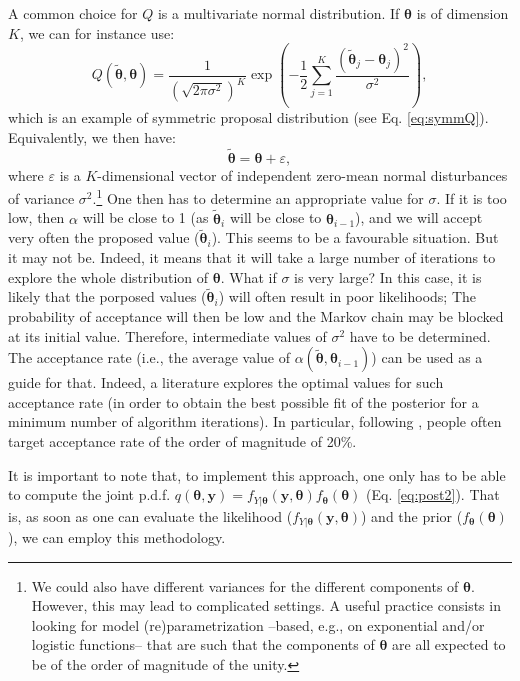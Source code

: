 \documentclass[
  12pt,
]{book}
\theoremstyle{definition}
\theoremstyle{definition}
\theoremstyle{definition}
\theoremstyle{definition}
\theoremstyle{remark}
\begin{document}
A common choice for \(Q\) is a multivariate normal distribution. If \({\boldsymbol\theta}\) is of dimension \(K\), we can for instance use:
\[
Q(\tilde{\boldsymbol\theta},{\boldsymbol\theta})= \frac{1}{\left(\sqrt{2\pi\sigma^2}\right)^K}\exp\left(-\frac{1}{2}\sum_{j=1}^K\frac{(\tilde{\boldsymbol\theta}_j-{\boldsymbol\theta}_j)^2}{\sigma^2}\right),
\]
which is an example of symmetric proposal distribution (see Eq. \eqref{eq:symmQ}). Equivalently, we then have:
\[
\tilde{\boldsymbol\theta} = {\boldsymbol\theta} + \varepsilon,
\]
where \(\varepsilon\) is a \(K\)-dimensional vector of independent zero-mean normal disturbances of variance \(\sigma^2\).\footnote{We could also have different variances for the different components of \({\boldsymbol\theta}\). However, this may lead to complicated settings. A useful practice consists in looking for model (re)parametrization --based, e.g., on exponential and/or logistic functions-- that are such that the components of \({\boldsymbol\theta}\) are all expected to be of the order of magnitude of the unity.} One then has to determine an appropriate value for \(\sigma\). If it is too low, then \(\alpha\) will be close to 1 (as \(\tilde{{\boldsymbol\theta}}_i\) will be close to \({\boldsymbol\theta}_{i-1}\)), and we will accept very often the proposed value (\(\tilde{{\boldsymbol\theta}}_i\)). This seems to be a favourable situation. But it may not be. Indeed, it means that it will take a large number of iterations to explore the whole distribution of \({\boldsymbol\theta}\). What if \(\sigma\) is very large? In this case, it is likely that the porposed values (\(\tilde{{\boldsymbol\theta}}_i\)) will often result in poor likelihoods; The probability of acceptance will then be low and the Markov chain may be blocked at its initial value. Therefore, intermediate values of \(\sigma^2\) have to be determined. The acceptance rate (i.e., the average value of \(\alpha(\tilde{{\boldsymbol\theta}},{\boldsymbol\theta}_{i-1})\)) can be used as a guide for that. Indeed, a literature explores the optimal values for such acceptance rate (in order to obtain the best possible fit of the posterior for a minimum number of algorithm iterations). In particular, following \citet{Roberts_Gelman_Gilks_1997}, people often target acceptance rate of the order of magnitude of 20\%.

It is important to note that, to implement this approach, one only has to be able to compute the joint p.d.f. \(q({\boldsymbol\theta},\mathbf{y})=f_{Y|{\boldsymbol\theta}}(\mathbf{y},{\boldsymbol\theta})f_{\boldsymbol\theta}({\boldsymbol\theta})\) (Eq. \eqref{eq:post2}). That is, as soon as one can evaluate the likelihood (\(f_{Y|{\boldsymbol\theta}}(\mathbf{y},{\boldsymbol\theta})\)) and the prior (\(f_{\boldsymbol\theta}({\boldsymbol\theta})\)), we can employ this methodology.
\end{document}
